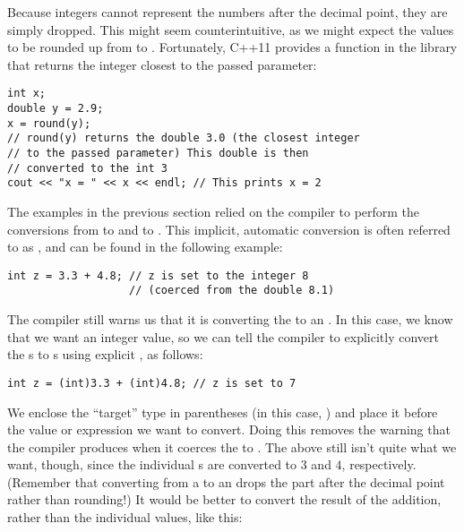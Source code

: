 Because integers cannot represent the numbers after the decimal point, they are simply dropped. 
This might seem counterintuitive, as we might expect the values to be rounded up from  to . 
Fortunately, C++11 provides a  function in the  library that returns the integer closest to the passed parameter:

\noindent\begin{minipage}{\linewidth}\begin{lstlisting}
int x;
double y = 2.9;
x = round(y); 
// round(y) returns the double 3.0 (the closest integer 
// to the passed parameter) This double is then 
// converted to the int 3
cout << "x = " << x << endl; // This prints x = 2
\end{lstlisting}\end{minipage}


The examples in the previous section relied on the compiler to perform the conversions from  to  and  to . 
This implicit, automatic conversion is often referred to as , and can be found in the following example:

\noindent\begin{minipage}{\linewidth}\begin{lstlisting}
int z = 3.3 + 4.8; // z is set to the integer 8 
                   // (coerced from the double 8.1)
\end{lstlisting}\end{minipage}

The compiler still warns us that it is converting the  to an . 
In this case, we know that we want an integer value, so we can tell the compiler to explicitly convert the s to s using explicit , as follows:

\noindent\begin{minipage}{\linewidth}\begin{lstlisting}
int z = (int)3.3 + (int)4.8; // z is set to 7
\end{lstlisting}\end{minipage}

We enclose the ``target'' type in parentheses (in this case, ) and place it before the value or expression we want to convert. 
Doing this removes the warning that the compiler produces when it coerces the  to . 
The above still isn't quite what we want, though, since the individual s are converted to $3$ and $4$, respectively. 
(Remember that converting from a  to an  drops the part after the decimal point rather than rounding!) 
It would be better to convert the result of the addition, rather than the individual values, like this:

